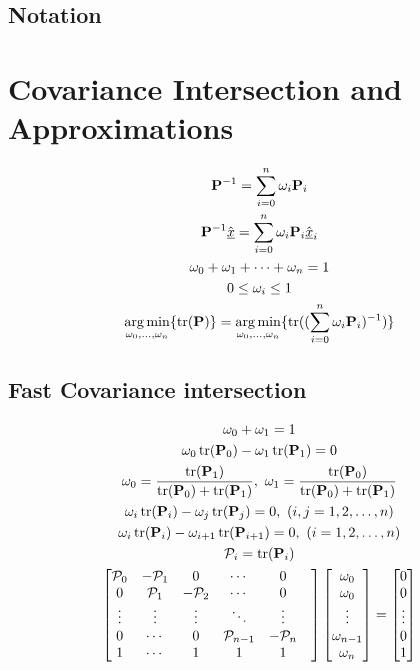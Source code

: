 \documentclass[letterpaper, 10 pt, conference]{ieeeconf}  %
\begin{document}
\subsection{Notation}

\section{Covariance Intersection and Approximations}
\begin{gather}
   {\ensuremath{{\mathbf{P}}}}^{-1}=\sum_{i=0}^{n}\omega_i {{\mathbf{P}}}_i \\
   {{\mathbf{P}}}^{-1} \hat{{\underline{x}}} =\sum_{i=0}^{n}\omega_i {{\mathbf{P}}}_i \hat{{\underline{x}}}_i \\
   \omega_0 + \omega_1 + \cdots + \omega_n = 1 \\
   0 \leq \omega_i \leq 1 \\
   \operatorname*{arg\,min}_{\omega_0,\dots,\omega_n} \{\operatorname{tr}({{\mathbf{P}}})\} = \operatorname*{arg\,min}_{\omega_0,\dots,\omega_n} \{\operatorname{tr}((\sum_{i=0}^{n}\omega_i {{\mathbf{P}}}_i)^{-1})\}
\end{gather}
\subsection{Fast Covariance intersection}
\begin{gather}
   \omega_0 + \omega_1 = 1 \\
   \omega_0 \tr(\mP_0) - \omega_1 \tr(\mP_1) = 0 \\
   \omega_0 = \frac{\tr(\mP_1)}{\tr(\mP_0)+\tr(\mP_1)},\ \omega_1 = \frac{\tr(\mP_0)}{\tr(\mP_0)+\tr(\mP_1)} \\
   \omega_i \tr(\mP_i) - \omega_j \tr(\mP_j) = 0,\ (i,j=1,2,\dots,n)\\
   \omega_i \tr(\mP_i) - \omega_{i+1} \tr(\mP_{i+1}) = 0,\ (i=1,2,\dots,n)\\
   \mathcal{P}_i = \tr(\mP_i) \\
   \begin{bmatrix}
      \mathcal{P}_0 & -\mathcal{P}_1 & 0 & \cdots & 0 \\
      0 & \mathcal{P}_1 & -\mathcal{P}_2 & \cdots & 0 \\
      \vdots & \vdots & \vdots & \ddots & \vdots & \\
      0 & \cdots & 0 & \mathcal{P}_{n-1} & -\mathcal{P}_n \\
      1 & \cdots & 1 & 1 & 1 &
   \end{bmatrix}
   \begin{bmatrix}
      \omega_0 \\
      \omega_0 \\
      \vdots \\
      \omega_{n-1} \\
      \omega_n
   \end{bmatrix}
   =
   \begin{bmatrix}
      0 \\
      0 \\
      \vdots \\
      0 \\
      1
   \end{bmatrix}
\end{gather}
\end{document}
